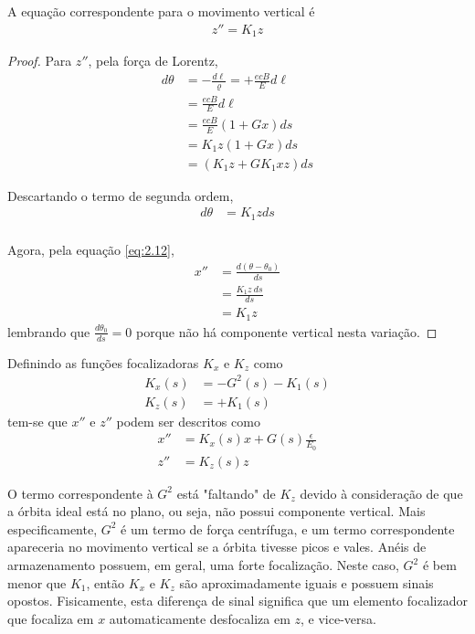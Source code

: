 A equação correspondente para o movimento vertical é
\begin{align}
	z'' = K_1 z
\end{align}

\begin{proof}
	Para $z''$, pela força de Lorentz,
	\begin{align*}
		d\theta &= -\frac{d\ell}{\varrho} = + \frac{ecB}{E}d\ell\\
				&= \frac{ecB}{E}d\ell\\
				&= \frac{ecB}{E}(1+Gx)ds\\
				&= K_1 z (1+Gx)ds\\
				& = (K_1 z + GK_1xz)ds
	\end{align*}
	
	Descartando o termo de segunda ordem,
	\begin{align*}
		d\theta &= K_1 z ds\\
	\end{align*}
	
	Agora, pela equação \eqref{eq:2.12},
	\begin{align*}
		x'' &= \frac{d(\theta-\theta_0)}{ds}\\
			&= \frac{K_1 z\ ds}{ds}\\
			&= K_1 z
	\end{align*}
	lembrando que $\frac{d\theta_0}{ds} = 0$ porque não há componente vertical nesta variação.
\end{proof}

Definindo as funções focalizadoras $K_x$ e $K_z$ como
\begin{align}
	K_x(s) &= -G^2(s)-K_1(s)\\
	K_z(s) &= + K_1(s)
\end{align}
tem-se que $x''$ e $z''$ podem ser descritos como
\begin{align}
	x'' &= K_x(s)x + G(s)\frac{\epsilon}{E_0}\label{eq:2.19}\\
	z'' &= K_z(s)z\label{eq:2.20}
\end{align}

O termo correspondente à $G^2$ está "faltando" de $K_z$ devido à consideração de que a órbita ideal está no plano, ou seja, não possui componente vertical. Mais especificamente, $G^2$ é um termo de força centrífuga, e um termo correspondente apareceria no movimento vertical se a órbita tivesse picos e vales. Anéis de armazenamento possuem, em geral, uma forte focalização. Neste caso, $G^2$ é bem menor que $K_1$, então $K_x$ e $K_z$ são aproximadamente iguais e possuem sinais opostos. Fisicamente, esta diferença de sinal significa que um elemento focalizador que focaliza em $x$ automaticamente desfocaliza em $z$, e vice-versa.

